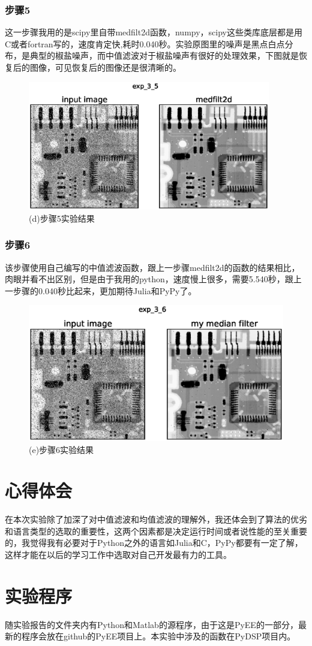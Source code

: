 \documentclass[]{IEEEphot}
\begin{document}
\subsubsection{步骤5}
这一步骤我用的是scipy里自带medfilt2d函数，numpy，scipy这些类库底层都是用C或者fortran写的，速度肯定快,耗时0.040秒。实验原图里的噪声是黑点白点分布，是典型的椒盐噪声，而中值滤波对于椒盐噪声有很好的处理效果，下图就是恢复后的图像，可见恢复后的图像还是很清晰的。
\begin{figure}[h]
	\centering
	\includegraphics[width=25pc]{exp_3_5.eps}
	\caption{(d)步骤5实验结果}
\end{figure}
\subsubsection{步骤6}
该步骤使用自己编写的中值滤波函数，跟上一步骤medfilt2d的函数的结果相比，肉眼并看不出区别，但是由于我用的python，速度慢上很多，需要5.540秒，跟上一步骤的0.040秒比起来，更加期待Julia和PyPy了。
\begin{figure}
	\centering
	\includegraphics[width=30pc]{exp_3_6.eps}
	\caption{(e)步骤6实验结果}
\end{figure}
\section{心得体会}
在本次实验除了加深了对中值滤波和均值滤波的理解外，我还体会到了算法的优劣和语言类型的选取的重要性，这两个因素都是决定运行时间或者说性能的至关重要的，我觉得我有必要对于Python之外的语言如Julia和C，PyPy都要有一定了解，这样才能在以后的学习工作中选取对自己开发最有力的工具。
\section{实验程序}
随实验报告的文件夹内有Python和Matlab的源程序，由于这是PyEE的一部分，最新的程序会放在github的PyEE项目上。本实验中涉及的函数在PyDSP项目内。
\end{document}
